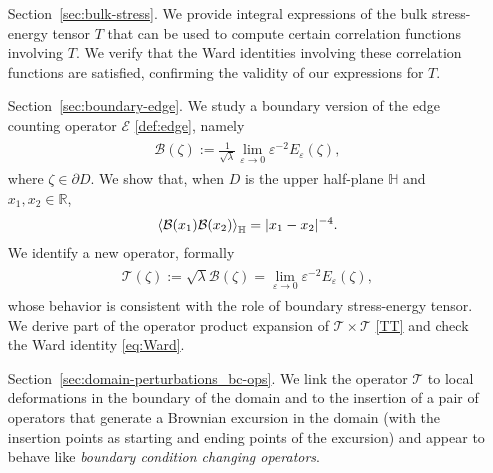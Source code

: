 \documentclass[a4paper,11pt]{article}
\begin{document}
\begin{enumerate}
    \item[Section~\ref{sec:bulk-stress}.] We provide integral expressions of the bulk stress-energy tensor $T$ that can be used to compute certain correlation functions involving $T$. We verify that the Ward identities involving these correlation functions are satisfied, confirming the validity of our expressions for $T$. %
    
    \item[Section~\ref{sec:boundary-edge}.] We study a boundary version of the edge counting operator $\mathcal{E}$ \eqref{def:edge}, namely
    \begin{align}
    \begin{split} \label{def:boundary-edge-normalized}
        {\mathcal B}(\zeta) := \frac{1}{\sqrt\lambda} \lim_{\varepsilon \to 0} \varepsilon^{-2} E_{\varepsilon}(\zeta),
    \end{split}
    \end{align}
    where $\zeta \in \partial D$. We show that, when $D$ is the upper half-plane $\mathbb{H}$ and $x_1,x_2 \in \mathbb{R}$,
    \begin{align}
        \Braket{{\mathcal B}(x_1){\mathcal B}(x_2)}_{\mathbb H} = |x_1-x_2|^{-4}.
    \end{align}
    We identify a new operator, formally
    \begin{align}
    \begin{split}
        {\mathcal T}(\zeta) := \sqrt{\lambda }{\mathcal B}(\zeta) = \lim_{\varepsilon \to 0} \varepsilon^{-2} E_{\varepsilon}(\zeta),
    \end{split}
    \end{align}
    whose behavior is consistent with the role of boundary stress-energy tensor. We derive part of the operator product expansion of $\mathcal{T} \times \mathcal{T}$ \eqref{TT} and check the Ward identity \eqref{eq:Ward}.
    
    \item[Section~\ref{sec:domain-perturbations_bc-ops}.] We link the operator $\mathcal{T}$ to local deformations in the boundary of the domain and to the insertion of a pair of operators that generate a Brownian excursion in the domain (with the insertion points as starting and ending points of the excursion) and appear to behave like \emph{boundary condition changing operators}.
\end{enumerate}
\end{document}
